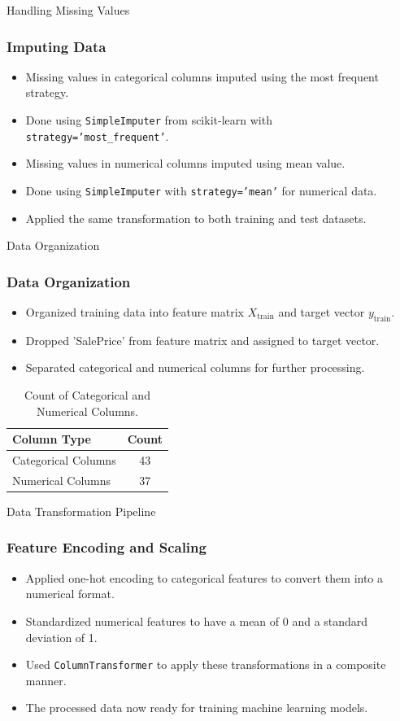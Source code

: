 \begin{frame}{Handling Missing Values}
    \frametitle{Imputing Data}
    \begin{itemize}
        \item Missing values in categorical columns imputed using the most frequent strategy.
        \item Done using \texttt{SimpleImputer} from scikit-learn with \texttt{strategy='most\_frequent'}.
        \item Missing values in numerical columns imputed using mean value.
        \item Done using \texttt{SimpleImputer} with \texttt{strategy='mean'} for numerical data.
        \item Applied the same transformation to both training and test datasets.
    \end{itemize}
\end{frame}

\begin{frame}{Data Organization}
    \frametitle{Data Organization}
    \begin{itemize}
        \item Organized training data into feature matrix \(X_{\text{train}}\) and target vector \(y_{\text{train}}\).
        \item Dropped 'SalePrice' from feature matrix and assigned to target vector.
        \item Separated categorical and numerical columns for further processing.
    \end{itemize}
    \begin{table}[H]
        \centering
        \begin{tabular}{|l|c|}
        \hline
        \textbf{Column Type} & \textbf{Count} \\
        \hline
        Categorical Columns & 43 \\
        Numerical Columns & 37 \\
        \hline
        \end{tabular}
        \caption{Count of Categorical and Numerical Columns.}
        \label{tab:column_counts}
    \end{table}
\end{frame}

\begin{frame}{Data Transformation Pipeline}
    \frametitle{Feature Encoding and Scaling}
    \begin{itemize}
        \item Applied one-hot encoding to categorical features to convert them into a numerical format.
        \item Standardized numerical features to have a mean of 0 and a standard deviation of 1.
        \item Used \texttt{ColumnTransformer} to apply these transformations in a composite manner.
        \item The processed data now ready for training machine learning models.
    \end{itemize}
\end{frame}

